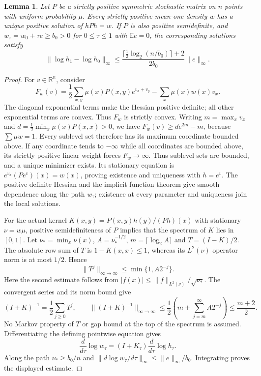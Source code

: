 \documentclass[11pt]{article}
\newcommand{\E}{\mathbb E}
\newtheorem{lemma}[theorem]{Lemma}
\begin{document}
\begin{lemma}\label{inversestationary}
Let $P$ be a strictly positive symmetric stochastic matrix on $n$ points
with uniform probability $\mu$. Every strictly positive mean-one density
$w$ has a unique positive solution of $hPh=w$. If $P$ is also positive
semidefinite, and $w_\tau=w_0+\tau e\geq b_0>0$ for $0\leq\tau\leq1$
with $\E e=0$, the corresponding solutions satisfy
\[
 \|\log h_1-\log h_0\|_\infty
 \leq\frac{\lceil\tfrac12\log_2(n/b_0)\rceil+2}{2b_0}
       \|e\|_\infty.
\]
\end{lemma}
\begin{proof}
For $v\in\mathbb R^n$, consider
\[
 F_w(v)=\frac12\sum_{x,y}\mu(x)P(x,y)e^{v_x+v_y}
              -\sum_x\mu(x)w(x)v_x.
\]
The diagonal exponential terms make the Hessian positive definite;
all other exponential terms are convex. Thus $F_w$ is strictly convex.
Writing $m=\max_x v_x$ and
$d=\tfrac12\min_x\mu(x)P(x,x)>0$, we have
$F_w(v)\geq de^{2m}-m$, because $\sum\mu w=1$.
Every sublevel set therefore has its maximum coordinate bounded above.
If any coordinate tends to $-\infty$ while all coordinates are bounded
above, its strictly positive linear weight forces $F_w\to\infty$.
Thus sublevel sets are bounded, and a unique minimizer exists. Its
stationary equation is $e^{v_x}(Pe^v)(x)=w(x)$, proving existence and
uniqueness with $h=e^v$. The positive definite Hessian and the implicit
function theorem give smooth dependence along the path $w_\tau$;
existence at every parameter and uniqueness join the local solutions.

For the actual kernel $K(x,y)=P(x,y)h(y)/(Ph)(x)$ with stationary
$\nu=w\mu$, positive semidefiniteness of $P$ implies that the spectrum
of $K$ lies in $[0,1]$. Let $\nu_* =\min_x\nu(x)$, $A=\nu_*^{-1/2}$,
$m=\lceil\log_2 A\rceil$ and $T=(I-K)/2$.
The absolute row sum of $T$ is $1-K(x,x)\leq1$, whereas its
$L^2(\nu)$ operator norm is at most $1/2$. Hence
\[
 \|T^j\|_{\infty\to\infty}\leq\min\{1,A2^{-j}\}.
\]
Here the second estimate follows from
$|f(x)|\leq\|f\|_{L^2(\nu)}/\sqrt{\nu_*}$.
The convergent series and its norm bound give
\[
 (I+K)^{-1}=\frac12\sum_{j\geq0}T^j,\qquad
 \|(I+K)^{-1}\|_{\infty\to\infty}
 \leq\frac12\left(m+\sum_{j=m}^{\infty}A2^{-j}\right)
 \leq\frac{m+2}{2}.
\]
No Markov property of $T$ or gap bound at the top of the spectrum is
assumed. Differentiating the defining pointwise equation gives
\[
 \frac{d}{d\tau}\log w_\tau
       =(I+K_\tau)\frac{d}{d\tau}\log h_\tau.
\]
Along the path $\nu_*\geq b_0/n$ and
$\|d\log w_\tau/d\tau\|_\infty\leq\|e\|_\infty/b_0$.
Integrating proves the displayed estimate.
\end{proof}
\end{document}
